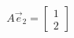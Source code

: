 \documentclass[preview]{standalone}
\begin{document}
\begin{align*}
A\vec{e}_2=\begin{bmatrix}1\\2\end{bmatrix}
\end{align*}
\end{document}
